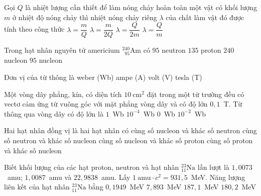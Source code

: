 	\begin{ex}%
		Gọi $Q$ là nhiệt lượng cần thiết để làm nóng chảy hoàn toàn một vật có khối lượng $m$ ở nhiệt độ nóng chảy thì nhiệt nóng chảy riêng $\lambda$ của chất làm vật đó được tính theo công thức
		\choice
		{$\lambda=\dfrac{m}{Q}$}
		{$\lambda=\dfrac{m}{2Q}$}
		{$\lambda=\dfrac{Q}{2m}$}
		{\True $\lambda=\dfrac{Q}{m}$}
	\end{ex}

	\begin{ex}%
		Trong hạt nhân nguyên tử americium $^{240}_{\phantom{2}95}\text{Am}$ có
		\choice
		{$95$ neutron}
		{$135$ proton}
		{\True $240$ nucleon}
		{$95$ nucleon}
	\end{ex}

	\begin{ex}%
		Đơn vị của từ thông là
		\choice
		{\True weber (Wb)}
		{ampe (A)}
		{volt (V)}
		{tesla (T)}
	\end{ex}

	\begin{ex}%
		Một vòng dây phẳng, kín, có diện tích $10~\text{cm}^2$ đặt trong một từ trường đều có vectơ cảm ứng từ vuông góc với mặt phẳng vòng dây và có độ lớn $0{,}1$~T. Từ thông qua vòng dây có độ lớn là
		\choice
		{$1$~Wb}
		{\True $10^{-4}$~Wb}
		{$0$~Wb}
		{$10^{-2}$~Wb}
	\end{ex}

	\begin{ex}%
		Hai hạt nhân đồng vị là hai hạt nhân có
		\choice
		{cùng số nucleon và khác số neutron}
		{cùng số neutron và khác số nucleon}
		{cùng số nucleon và khác số proton}
		{\True cùng số proton và khác số nucleon}
	\end{ex}

	\begin{ex}%
		Biết khối lượng của các hạt proton, neutron và hạt nhân ${}^{23}_{11}\text{Na}$ lần lượt là $1{,}0073$~amu; $1{,}0087$~amu và $22{,}9838$~amu. Lấy $1~\text{amu}\cdot c^2=931{,}5$~MeV. Năng lượng liên kết của hạt nhân ${}^{23}_{11}\text{Na}$ bằng
		\choice
		{$0{,}1949$~MeV}
		{$7{,}893$~MeV}
		{\True $187{,}1$~MeV}
		{$180{,}2$~MeV}
	\end{ex}

